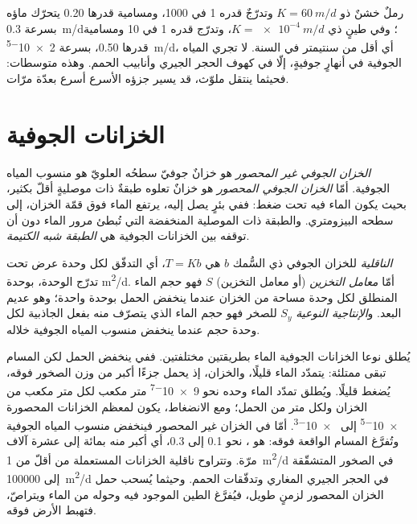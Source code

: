 رملٌ خشنٌ ذو $K = \qty{60}{m/d}$ وتدرّجٌ قدره 1 في 1000،
ومسامية قدرها 0.20 يتحرّك ماؤه بسرعة \qty{0.3}{m/d}؛ وفي طينٍ ذي $K =
\qty{e-4}{m/d}$، وتدرّج قدره 1 في 10 ومسامية قدرها 0.50، بسرعة
\qty{2e-5}{m/d}، أي أقل من سنتيمتر في السنة. لا تجري المياه الجوفية
في أنهارٍ جوفيةٍ، إلّا في كهوف الحجر الجيري وأنابيب
الحمم. وهذه متوسطات: فحيثما ينتقل ملوّث، قد يسير جزؤه الأسرع
أسرع بعدّة مرّات.

\section{الخزانات الجوفية}\label{sec:b3:hydrogeology:aquifers}

\begin{definition}\label{def:b3:hydrogeology:aquifer-types}
\emph{الخزان الجوفي غير المحصور} هو خزانٌ جوفيّ
سطحُه العلويّ هو منسوب المياه الجوفية. أمّا \emph{الخزان الجوفي
المحصور} هو خزانٌ تعلوه طبقةٌ ذات
موصليةٍ أقلّ بكثير، بحيث يكون الماء فيه تحت ضغط: ففي بئرٍ
يصل إليه، يرتفع الماء فوق قمّة الخزان، إلى
سطحه البيزومتري. والطبقة ذات الموصلية المنخفضة التي تُبطئ مرور الماء دون أن
توقفه بين الخزانات الجوفية هي
\emph{الطبقة شبه الكتيمة}.
\end{definition}

\begin{definition}\label{def:b3:hydrogeology:storage}
\emph{الناقلية} للخزان الجوفي ذي السُّمك
$b$ هي $T = Kb$، أي التدفّق لكل وحدة عرض تحت تدرّج الوحدة، بوحدة
\unit{m^2/d}. أمّا \emph{معامل التخزين}
(أو معامل التخزين) $S$ فهو حجم الماء المنطلق لكل وحدة مساحة من
الخزان عندما ينخفض الحمل بوحدة واحدة؛ وهو عديم البعد.
و\emph{الإنتاجية النوعية} $S_y$ للصخر فهو حجم
الماء الذي يتصرّف منه بفعل الجاذبية لكل وحدة حجم عندما ينخفض
منسوب المياه الجوفية خلاله.
\end{definition}

يُطلق نوعا الخزانات الجوفية الماء بطريقتين مختلفتين. ففي  ينخفض الحمل لكن المسام تبقى ممتلئة: يتمدّد الماء قليلًا،
والخزان، إذ يحمل جزءًا أكبر من وزن الصخور فوقه،
يُضغط قليلًا. ويُطلق تمدّد الماء وحده نحو
\num{9e-7} متر مكعب لكل متر مكعب من الخزان ولكل متر من الحمل؛
ومع الانضغاط، يكون  لمعظم الخزانات المحصورة
\num{e-5} إلى \num{e-3}. أمّا في الخزان غير المحصور فينخفض منسوب المياه الجوفية
وتُفرَّغ المسام الواقعة فوقه:  هو ، نحو 0.1
إلى 0.3، أي أكبر منه بمائة إلى عشرة آلاف مرّة. وتتراوح ناقلية الخزانات
المستعملة من أقلّ من \qty{1}{m^2/d} في الصخور المتشقّقة
إلى \qty{100000}{m^2/d} في الحجر الجيري المغاري وتدفّقات الحمم. وحيثما
يُسحب حمل الخزان المحصور لزمنٍ طويل، فيُفرَّغ الطين الموجود فيه وحوله من الماء
ويتراصّ، فتهبط الأرض فوقه.

